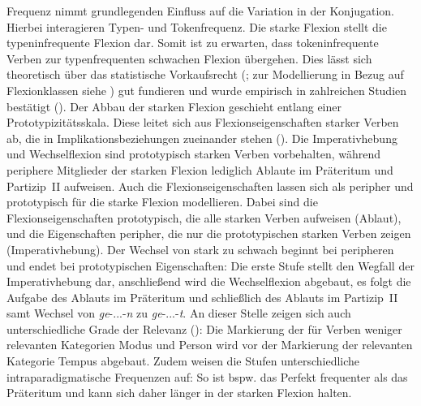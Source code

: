 Frequenz nimmt grundlegenden Einfluss auf die Variation in der Konjugation. Hierbei interagieren Typen- und Tokenfrequenz. Die starke Flexion stellt die typeninfrequente Flexion dar. Somit ist zu erwarten, dass tokeninfrequente Verben zur typenfrequenten schwachen Flexion übergehen. Dies lässt sich theoretisch über das statistische Vorkaufsrecht (\cite[74--94]{Goldberg.2019}; zur Modellierung in Bezug auf Flexionklassen siehe ) gut fundieren und wurde empirisch in zahlreichen Studien bestätigt (\cite{Augst.1975, Bittner.1996, Nowak.2015}). Der Abbau der starken Flexion geschieht entlang einer Prototypizitätsskala.  Diese leitet sich aus Flexionseigenschaften starker Verben ab, die in Implikationsbeziehungen zueinander stehen (\cite[26--27]{Dammel.2011b}).  Die Imperativhebung und Wechselflexion sind prototypisch starken Verben vorbehalten, während periphere Mitglieder der starken Flexion lediglich Ablaute im Präteritum und Partizip~II aufweisen. Auch die Flexionseigenschaften lassen sich als peripher und prototypisch für die starke Flexion modellieren. Dabei sind die Flexionseigenschaften prototypisch, die alle starken Verben aufweisen (Ablaut), und die Eigenschaften peripher, die nur die prototypischen starken Verben zeigen (Imperativhebung). Der Wechsel von stark zu schwach beginnt bei peripheren und endet bei prototypischen Eigenschaften: Die erste Stufe stellt den Wegfall der Imperativhebung dar, anschließend wird die Wechselflexion abgebaut, es folgt die Aufgabe des Ablauts im Präteritum und schließlich des Ablauts im Partizip~II samt Wechsel von \textit{ge}-...-\textit{n} zu \textit{ge}-...-\textit{t}. An dieser Stelle zeigen sich auch unterschiedliche Grade der Relevanz (\cite[133]{Nowak.2016}): Die Markierung der für Verben weniger relevanten Kategorien Modus und Person wird vor der Markierung der relevanten Kategorie Tempus abgebaut. Zudem weisen die Stufen unterschiedliche intraparadigmatische Frequenzen auf: So ist bspw. das Perfekt frequenter als das Präteritum und kann sich daher länger in der starken Flexion halten. 


